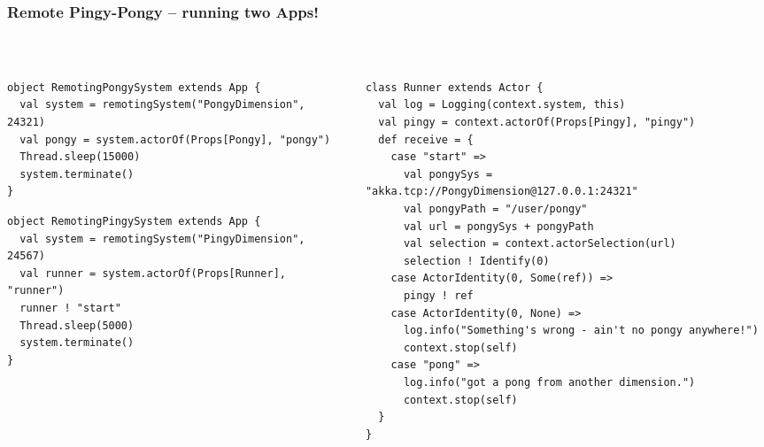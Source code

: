 \documentclass[aspectratio=169]{beamer}
\begin{document}
\begin{frame}[fragile]\frametitle{Remote Pingy-Pongy -- running two Apps!}
~\\[-6mm]
\begin{columns}[t]
\begin{column}{0.46\textwidth}
\begin{lstlisting}[basicstyle=\ttfamily\tiny,emph={Actor, Logging, Props, ourSystem,terminate,sleep,actorOf,receive, watch,stop,Terminated}]
object RemotingPongySystem extends App {
  val system = remotingSystem("PongyDimension", 24321)
  val pongy = system.actorOf(Props[Pongy], "pongy")
  Thread.sleep(15000)
  system.terminate()
}
\end{lstlisting}
\begin{lstlisting}[basicstyle=\ttfamily\tiny,
  emph={Actor, Logging, Props, ourSystem,terminate,sleep,actorOf,receive, watch,stop,Terminated}]
object RemotingPingySystem extends App {
  val system = remotingSystem("PingyDimension", 24567)
  val runner = system.actorOf(Props[Runner], "runner")
  runner ! "start"
  Thread.sleep(5000)
  system.terminate()
}
\end{lstlisting}
\end{column}
\begin{column}{0.54\textwidth}
\begin{lstlisting}[basicstyle=\ttfamily\tiny,
  emph={Actor, Logging, Props, ourSystem,terminate,sleep,actorOf,receive,become,stop}]
class Runner extends Actor {
  val log = Logging(context.system, this)
  val pingy = context.actorOf(Props[Pingy], "pingy")
  def receive = {
    case "start" =>
      val pongySys = "akka.tcp://PongyDimension@127.0.0.1:24321"
      val pongyPath = "/user/pongy"
      val url = pongySys + pongyPath
      val selection = context.actorSelection(url)
      selection ! Identify(0)
    case ActorIdentity(0, Some(ref)) =>
      pingy ! ref
    case ActorIdentity(0, None) =>
      log.info("Something's wrong - ain't no pongy anywhere!")
      context.stop(self)
    case "pong" =>
      log.info("got a pong from another dimension.")
      context.stop(self)
  }
}
\end{lstlisting}
\end{column}
\end{columns}
\end{frame}
\end{document}
